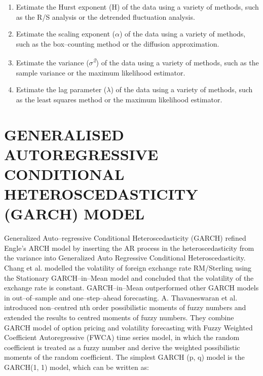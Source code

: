 \documentclass[12pt,a4paper]{report}
\numberwithin{equation}{section}
\begin{document}
\begin{enumerate}
\def\labelenumi{(\roman{enumi})}
\item
  Estimate the Hurst exponent (H) of the data using a variety of
  methods, such as the R/S analysis or the detrended fluctuation
  analysis.
\item
  Estimate the scaling exponent ($\alpha$) of the data using a variety of
  methods, such as the box--counting method or the diffusion
  approximation.
\item
  Estimate the variance (\emph{$\sigma$\textsuperscript{2}}) of the data using
  a variety of methods, such as the sample variance or the maximum
  likelihood estimator.
\item
  Estimate the lag parameter ($\lambda$) of the data using a variety of methods,
  such as the least squares method or the maximum likelihood estimator.
\end{enumerate}

\hypertarget{generalised--autoregressive--conditional--heteroscedasticity--garch--model}{%
\section{\texorpdfstring{\textbf{GENERALISED AUTOREGRESSIVE
CONDITIONAL HETEROSCEDASTICITY (GARCH)
MODEL}}{GENERALISED AUTOREGRESSIVE CONDITIONAL HETEROSCEDASTICITY (GARCH) MODEL}}\label{generalised--autoregressive--conditional--heteroscedasticity--garch--model}}

Generalized Auto--regressive Conditional Heteroscedasticity (GARCH)
\cite{bollerslev1992arch_21} refined Engle's \cite{engle1982autoregressive_22} ARCH model by inserting the AR process
in the heteroscedasticity from the variance into Generalized Auto
Regressive Conditional Heteroscedasticity. Chang et al. \cite{chang2011hybrid_23}
modelled the volatility of foreign exchange rate RM/Sterling using the
Stationary GARCH--in--Mean model and concluded that the volatility of the
exchange rate is constant. GARCH--in--Mean outperformed other GARCH models
in out--of--sample and one--step--ahead forecasting. A. Thavaneswaran et al.
\cite{thavaneswarana2009weighted_24} introduced non--centred nth order possibilistic moments of fuzzy
numbers and extended the results to centred moments of fuzzy numbers.
They combine GARCH model of option pricing and volatility forecasting
with Fuzzy Weighted Coefficient Autoregressive (FWCA) time series model,
in which the random coefficient is treated as a fuzzy number and derive
the weighted possibilistic moments of the random coefficient. The
simplest GARCH (p, q) model is the GARCH(1, 1) model, which can be
written as:
\end{document}
